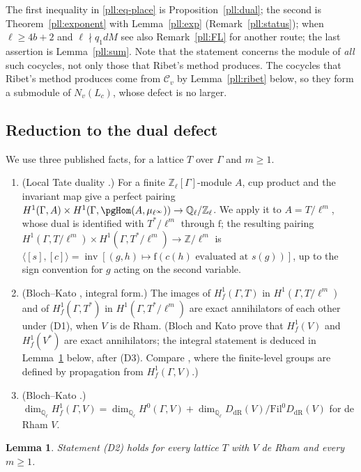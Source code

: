 \documentclass[10pt]{amsart}
\newtheorem{lemma}[theorem]{Lemma}
\theoremstyle{definition}
\theoremstyle{remark}
\newcommand{\Z}{\mathbb Z}
\newcommand{\Q}{\mathbb Q}
\begin{document}
The first inequality in \eqref{pll:eq-place} is Proposition~\ref{pll:dual}; the second is
Theorem~\ref{pll:exponent} with Lemma~\ref{pll:exp} (Remark~\ref{pll:status}); when $\ell\ge4b+2$ and
$\ell\nmid q_1dM$ see also Remark~\ref{pll:FL} for another route; the last assertion is Lemma~\ref{pll:sum}. Note that the statement concerns the
module of \emph{all} such cocycles, not only those that Ribet's method produces. The cocycles that
Ribet's method produces come from $\mathcal C_v$ by Lemma~\ref{pll:ribet} below, so they form a
submodule of $N_v(L_c)$, whose defect is no larger.

\subsection{Reduction to the dual defect}\label{pll:ss-duality}

We use three published facts, for a lattice $T$ over $\Gamma$ and $m\ge1$.
\begin{enumerate}
\item[(D1)] (Local Tate duality \cite[Theorem~7.2.6]{NSW}.) For a finite $\Z_\ell[\Gamma]$-module
$A$, cup product and the invariant map give a perfect pairing $H^1(\Gamma,A)\times
H^1(\Gamma,\pgHom(A,\mu_{\ell^\infty}))\to\Q_\ell/\Z_\ell$. We apply it to $A=T/\ell^m$, whose
dual is identified with $T^*/\ell^m$ through $\mathrm f$; the resulting pairing $H^1(\Gamma,
T/\ell^m)\times H^1(\Gamma,T^*/\ell^m)\to\Z/\ell^m$ is $\langle[s],[c]\rangle=
\operatorname{inv}[(g,h)\mapsto\mathrm f(c(h)\text{ evaluated at }s(g))]$, up to the sign
convention for $g$ acting on the second variable.
\item[(D2)] (Bloch--Kato \cite[Proposition~3.8]{BlochKato}, integral form.) The images of
$H^1_f(\Gamma,T)$ in $H^1(\Gamma,T/\ell^m)$ and of $H^1_f(\Gamma,T^*)$ in $H^1(\Gamma,T^*/\ell^m)$
are exact annihilators of each other under (D1), when $V$ is de Rham. (Bloch and Kato prove that
$H^1_f(V)$ and $H^1_f(V^*)$ are exact annihilators; the integral statement is deduced in
Lemma~\ref{pll:D2} below, after (D3). Compare \cite[Chapter~I, Proposition~4.3]{RubinES}, where the finite-level groups are defined by
propagation from $H^1_f(\Gamma,V)$.)
\item[(D3)] (Bloch--Kato \cite[Corollary~3.8.4]{BlochKato}.)
$\dim_{\Q_\ell}H^1_f(\Gamma,V)=\dim_{\Q_\ell}H^0(\Gamma,V)+\dim_{\Q_\ell}D_{\mathrm{dR}}(V)/
\mathrm{Fil}^0D_{\mathrm{dR}}(V)$ for de Rham $V$.
\end{enumerate}

\begin{lemma}\label{pll:D2}
Statement (D2) holds for every lattice $T$ with $V$ de Rham and every $m\ge1$.
\end{lemma}
\end{document}
